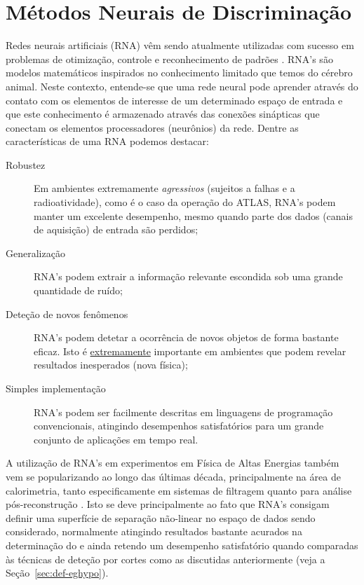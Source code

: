 \section{Métodos Neurais de Discriminação}
\label{sec:neural}

Redes neurais artificiais (RNA) vêm sendo atualmente utilizadas com sucesso em
problemas de otimização, controle e reconhecimento de padrões
\cite{haykin}. RNA's são modelos matemáticos inspirados no conhecimento
limitado que temos do cérebro animal. Neste contexto, entende-se que uma rede
neural pode aprender através do contato com os elementos de interesse de um
determinado espaço de entrada e que este conhecimento é armazenado através das
conexões sinápticas que conectam os elementos processadores (neurônios) da
rede. Dentre as características de uma RNA podemos destacar:

\begin{description}
\item[Robustez] Em ambientes extremamente \emph{agressivos} (sujeitos a falhas
e a radioatividade), como é o caso da operação do ATLAS, RNA's podem manter um
excelente desempenho, mesmo quando parte dos dados (canais de aquisição) de
entrada são perdidos;

\item[Generalização] RNA's podem extrair a informação relevante escondida sob
uma grande quantidade de ruído;

\item[Deteção de novos fenômenos] RNA's podem detetar a ocorrência de novos
objetos de forma bastante eficaz. Isto é \underline{extremamente} importante
em ambientes que podem revelar resultados inesperados (nova física);

\item[Simples implementação] RNA's podem ser facilmente descritas em
linguagens de programação convencionais, atingindo desempenhos satisfatórios
para um grande conjunto de aplicações em tempo real.
\end{description}

A utilização de RNA's em experimentos em Física de Altas Energias também vem
se popularizando ao longo das últimas década, principalmente na área de
calorimetria, tanto especificamente em sistemas de filtragem \cite{badgett92,
koehne96} quanto para análise pós-reconstrução \cite{altherr90}. Isto se deve
principalmente ao fato que RNA's consigam definir uma superfície de separação
não-linear no espaço de dados sendo considerado, normalmente atingindo
resultados bastante acurados na determinação do  e ainda
retendo um desempenho satisfatório quando comparadas às técnicas de deteção
por cortes como as discutidas anteriormente (veja a
Seção~\ref{sec:def-eghypo}).

